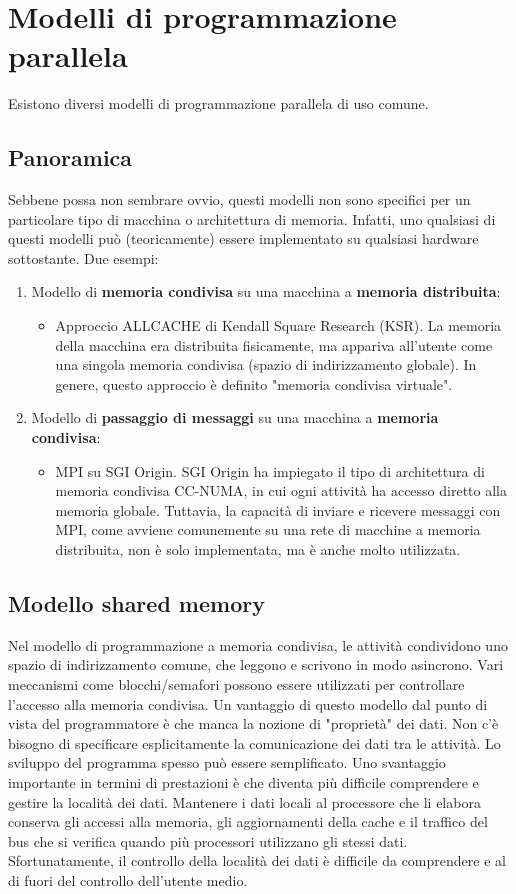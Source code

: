 \section{Modelli di programmazione parallela}
Esistono diversi modelli di programmazione parallela di uso comune.
\subsection{Panoramica}
Sebbene possa non sembrare ovvio, questi modelli non sono
specifici per un particolare tipo di macchina o architettura di memoria. Infatti, uno qualsiasi di questi modelli può (teoricamente)
essere implementato su qualsiasi hardware sottostante. Due esempi:
\begin{enumerate}
	\item  Modello di \textbf{memoria condivisa} su una macchina a \textbf{memoria distribuita}:
	\begin{itemize}
		\item  Approccio ALLCACHE di Kendall Square Research (KSR). La memoria della macchina era distribuita fisicamente, ma appariva all'utente come una
		singola memoria condivisa (spazio di indirizzamento globale). In genere, questo
		approccio è definito "memoria condivisa virtuale".
	\end{itemize}
	\item  Modello di \textbf{passaggio di messaggi} su una macchina a \textbf{memoria condivisa}:
	\begin{itemize}
		\item  MPI su SGI Origin. SGI Origin ha impiegato il tipo  di
		architettura di memoria condivisa CC-NUMA, in cui ogni attività ha accesso diretto alla
		memoria globale. Tuttavia, la capacità di inviare e ricevere messaggi
		con MPI, come avviene comunemente su una rete di macchine a memoria distribuita, non è solo implementata, ma è anche molto
		utilizzata.
	\end{itemize}
\end{enumerate}
\subsection{Modello shared memory}
Nel modello di programmazione a memoria condivisa, le attività condividono uno spazio di indirizzamento comune, che leggono e scrivono in modo asincrono. Vari meccanismi come blocchi/semafori possono essere utilizzati per controllare l'accesso alla memoria condivisa. Un vantaggio di questo modello dal punto di vista del programmatore è che manca la nozione di "proprietà" dei dati. Non c'è bisogno di specificare esplicitamente la comunicazione dei dati tra le attività. Lo sviluppo del programma spesso può essere semplificato. Uno svantaggio importante in termini di prestazioni è che diventa più difficile comprendere e gestire la località dei dati. Mantenere i dati locali al processore che li elabora conserva gli accessi alla memoria, gli aggiornamenti della cache e il traffico del bus che si verifica quando più processori utilizzano gli stessi dati. Sfortunatamente, il controllo della località dei dati è difficile da comprendere e al di fuori del controllo dell'utente medio.

